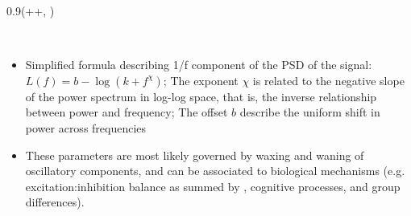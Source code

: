 \documentclass{beamer}
\newlength{\blockOne}
\begin{document}
\begin{frame}[t]



\TPshowboxesfalse

\begin{textblock*}{0.9\colwidth}(\leftmargin+\colwidth+\colsep, \blockOne)
	\begin{block}{~}
		\begin{itemize}

			\item  Simplified formula  describing 1/f component  of the  PSD  of the signal: $L(f) = b - \log(k + f^\chi)$;  The exponent ${\chi}$ is related to the negative slope of the power spectrum in log-log space, that is, the inverse relationship between power and frequency;  The offset $b$ describe the uniform shift in power across frequencies
		\item These parameters are most likely governed by waxing and waning of oscillatory components, and can be associated to biological mechanisms (e.g. excitation:inhibition balance as summed by \citep{waschke2021}, cognitive processes, and group differences). 
		

\end{itemize}
\end{block}
\end{textblock*}
\end{frame}
\end{document}
